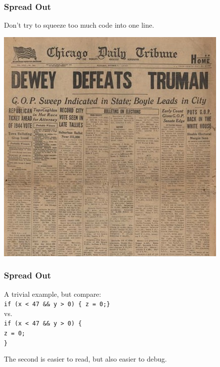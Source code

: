 \begin{frame}
\frametitle{Spread Out}
\begin{changemargin}{1cm}

Don't try to squeeze too much code into one line. 

\begin{center}
	\includegraphics[width=.65\textwidth]{images/newspaper.jpg}
\end{center} 

\end{changemargin}
\end{frame}

\begin{frame}
\frametitle{Spread Out}
\begin{changemargin}{1cm}

A trivial example, but compare:\\
\texttt{if (x < 47 \&\& y > 0) \{ z = 0;\} }\\
vs.\\
\texttt{if (x < 47 \&\& y > 0) \{\\ \hspace*{0.5cm} z = 0; \\ \} }

The second is easier to read, but also easier to debug. 

\end{changemargin}
\end{frame}

